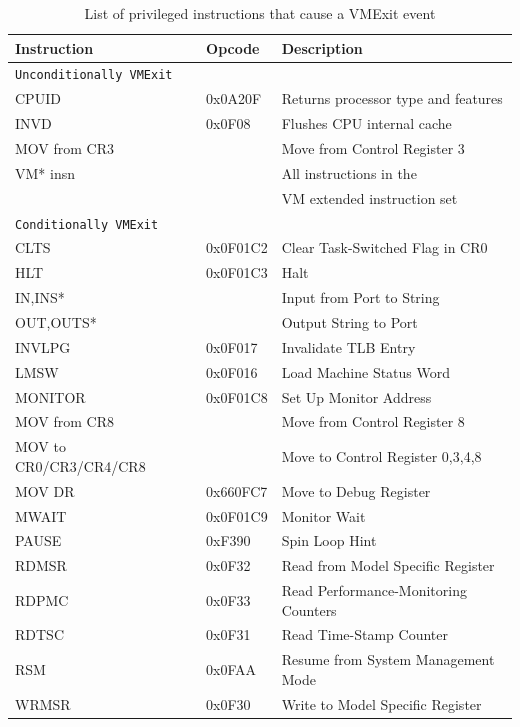 \begin{table}[t]
\centering
\begin{tabular}{|l|l|l|}
\hline
\bf{Instruction} & \bf{Opcode}  & \bf{Description}  \\
\hline
\texttt{Unconditionally VMExit}  \\
\hline
CPUID          & 0x0A20F & Returns processor type and features \\
INVD           & 0x0F08 & Flushes CPU internal cache  \\
MOV from CR3   &  & Move from Control Register 3 \\
VM* insn & & All instructions in the \\
& & VM extended instruction set \\
\hline
\texttt{Conditionally VMExit}  \\
\hline
CLTS          & 0x0F01C2 & Clear Task-Switched Flag in CR0 \\
HLT           & 0x0F01C3 & Halt \\
IN,INS*       &          & Input from Port to String \\
OUT,OUTS*     &          & Output String to Port \\
INVLPG        & 0x0F017  & Invalidate TLB Entry \\
LMSW          & 0x0F016  & Load Machine Status Word \\
MONITOR       & 0x0F01C8 & Set Up Monitor Address \\
MOV from CR8  &          & Move from Control Register 8 \\
MOV to CR0/CR3/CR4/CR8  && Move to Control Register 0,3,4,8 \\
MOV DR  & 0x660FC7   & Move to Debug Register \\
MWAIT   & 0x0F01C9   & Monitor Wait  \\
PAUSE   & 0xF390     & Spin Loop Hint \\
RDMSR   & 0x0F32     & Read from Model Specific Register \\
RDPMC   & 0x0F33     & Read Performance-Monitoring Counters \\
RDTSC   & 0x0F31     & Read Time-Stamp Counter \\
RSM     & 0x0FAA     & Resume from System Management Mode \\
WRMSR   & 0x0F30     & Write to Model Specific Register \\
\hline
\end{tabular}
\caption{List of privileged instructions that cause a VMExit event}
\label{virt:insntrap}
\end{table}

